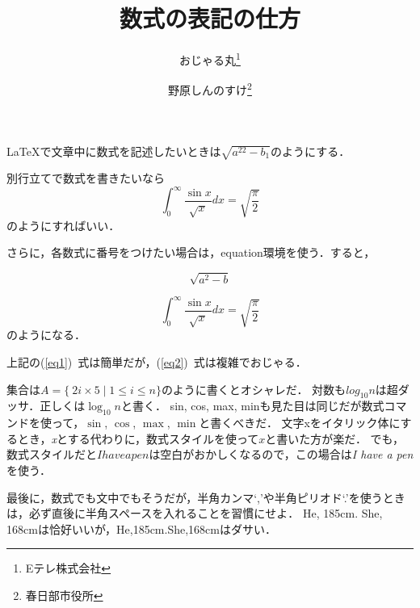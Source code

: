 \documentclass[a4j]{jarticle}
\begin{document}
\title{数式の表記の仕方}
\author{おじゃる丸\thanks{Eテレ株式会社} \and 野原しんのすけ\thanks{春日部市役所}}

\maketitle
\thispagestyle{empty}

\LaTeX で文章中に数式を記述したいときは$\sqrt{a^{22}-b_1}$のようにする．

別行立てで数式を書きたいなら\[ \int_0^\infty \frac{\sin x}{\sqrt{x}}dx = \sqrt{\frac{\pi}{2}} \]のようにすればいい．

さらに，各数式に番号をつけたい場合は，equation環境を使う．すると，

\begin{equation} \label{eq1}
\sqrt{a^2-b}　
\end{equation} 

\begin{equation} \label{eq2}
\int_0^\infty \frac{\sin x}{\sqrt{x}}dx = \sqrt{\frac{\pi}{2}} 
\end{equation}
のようになる．

上記の(\ref{eq1})~式は簡単だが，(\ref{eq2})~式は複雑でおじゃる．

\vspace{2zh}

集合は$A=\{\ 2i \times 5 \mid 1 \le i \leq n\}$のように書くとオシャレだ．%
対数も$log_{10} n$は超ダッサ．正しくは$\log_{10} n$と書く．
sin, cos, max, minも見た目は同じだが数式コマンドを使って，$\sin$, $\cos$, $\max$, $\min$と書くべきだ．
文字xをイタリック体にするとき，\textit{x}とする代わりに，数式スタイルを使って$x$と書いた方が楽だ．
でも，数式スタイルだと$I have a pen$は空白がおかしくなるので，この場合は\textit{I have a pen}を使う．

最後に，数式でも文中でもそうだが，半角カンマ`,'や半角ピリオド`.'を使うときは，必ず直後に半角スペースを入れることを習慣にせよ．
He, 185cm. She, 168cmは恰好いいが，He,185cm.She,168cmはダサい．
\end{document}

